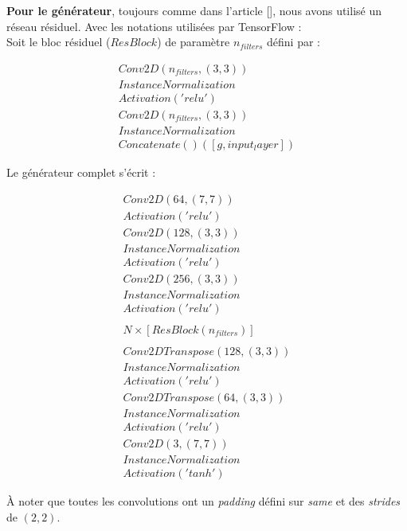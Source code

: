 \textbf{Pour le générateur}, toujours comme dans l'article [], nous avons utilisé un réseau résiduel. Avec les notations utilisées par TensorFlow :\\

Soit le bloc résiduel ($ResBlock$) de paramètre $n_{filters}$ défini par :


\[ \begin{array}{lcr}
Conv2D(n_{filters}, (3,3)) \\
InstanceNormalization \\
Activation('relu') \\
Conv2D(n_{filters}, (3,3))\\
InstanceNormalization\\
Concatenate()([g, input_layer]) \end{array}\]

Le générateur complet s'écrit :

\[ \begin{array}{lcr}
Conv2D(64, (7,7)) \\
Activation('relu') \\

Conv2D(128, (3,3)) \\
InstanceNormalization\\
Activation('relu')\\

Conv2D(256, (3,3)) \\
InstanceNormalization\\
Activation('relu')\\\\

N \times [ResBlock(n_{filters})]\\\\

Conv2DTranspose(128, (3,3)) \\
InstanceNormalization\\
Activation('relu')\\

Conv2DTranspose(64, (3,3)) \\
InstanceNormalization\\
Activation('relu')\\

Conv2D(3, (7,7)) \\
InstanceNormalization\\

Activation('tanh') \end{array}\]

À noter que toutes les convolutions ont un \textit{padding} défini sur \textit{same} et des \textit{strides} de $(2, 2)$.

